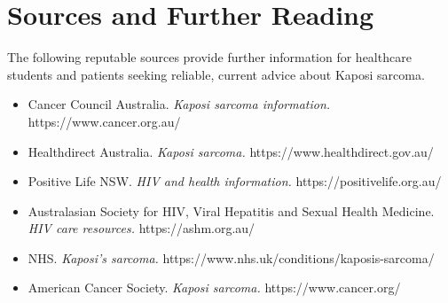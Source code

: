 \section*{Sources and Further Reading}
The following reputable sources provide further information for healthcare students and patients seeking reliable, current advice about Kaposi sarcoma.
\begin{itemize}
    \item Cancer Council Australia. \textit{Kaposi sarcoma information.} https://www.cancer.org.au/
    \item Healthdirect Australia. \textit{Kaposi sarcoma.} https://www.healthdirect.gov.au/
    \item Positive Life NSW. \textit{HIV and health information.} https://positivelife.org.au/
    \item Australasian Society for HIV, Viral Hepatitis and Sexual Health Medicine. \textit{HIV care resources.} https://ashm.org.au/
    \item NHS. \textit{Kaposi's sarcoma.} https://www.nhs.uk/conditions/kaposis-sarcoma/
    \item American Cancer Society. \textit{Kaposi sarcoma.} https://www.cancer.org/
\end{itemize}
